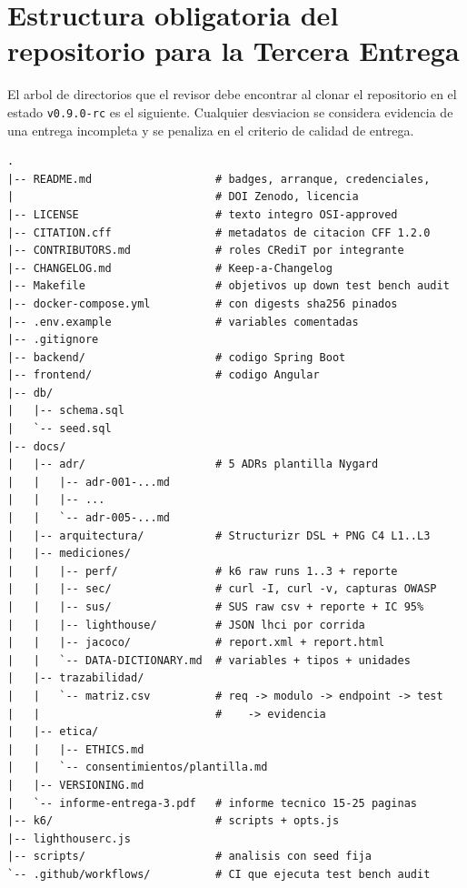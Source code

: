 \documentclass[11pt,a4paper]{article}
\begin{document}
\section{Estructura obligatoria del repositorio para la Tercera Entrega}

El arbol de directorios que el revisor debe encontrar al clonar el repositorio en el estado \texttt{v0.9.0-rc} es el siguiente. Cualquier desviacion se considera evidencia de una entrega incompleta y se penaliza en el criterio de calidad de entrega.

\begin{lstlisting}[caption={Estructura minima del repositorio para la Tercera Entrega}]
.
|-- README.md                   # badges, arranque, credenciales,
|                               # DOI Zenodo, licencia
|-- LICENSE                     # texto integro OSI-approved
|-- CITATION.cff                # metadatos de citacion CFF 1.2.0
|-- CONTRIBUTORS.md             # roles CRediT por integrante
|-- CHANGELOG.md                # Keep-a-Changelog
|-- Makefile                    # objetivos up down test bench audit
|-- docker-compose.yml          # con digests sha256 pinados
|-- .env.example                # variables comentadas
|-- .gitignore
|-- backend/                    # codigo Spring Boot
|-- frontend/                   # codigo Angular
|-- db/
|   |-- schema.sql
|   `-- seed.sql
|-- docs/
|   |-- adr/                    # 5 ADRs plantilla Nygard
|   |   |-- adr-001-...md
|   |   |-- ...
|   |   `-- adr-005-...md
|   |-- arquitectura/           # Structurizr DSL + PNG C4 L1..L3
|   |-- mediciones/
|   |   |-- perf/               # k6 raw runs 1..3 + reporte
|   |   |-- sec/                # curl -I, curl -v, capturas OWASP
|   |   |-- sus/                # SUS raw csv + reporte + IC 95%
|   |   |-- lighthouse/         # JSON lhci por corrida
|   |   |-- jacoco/             # report.xml + report.html
|   |   `-- DATA-DICTIONARY.md  # variables + tipos + unidades
|   |-- trazabilidad/
|   |   `-- matriz.csv          # req -> modulo -> endpoint -> test
|   |                           #    -> evidencia
|   |-- etica/
|   |   |-- ETHICS.md
|   |   `-- consentimientos/plantilla.md
|   |-- VERSIONING.md
|   `-- informe-entrega-3.pdf   # informe tecnico 15-25 paginas
|-- k6/                         # scripts + opts.js
|-- lighthouserc.js
|-- scripts/                    # analisis con seed fija
`-- .github/workflows/          # CI que ejecuta test bench audit
\end{lstlisting}
\end{document}
